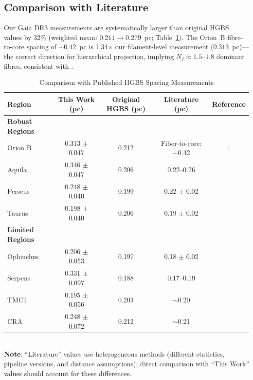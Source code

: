 \documentclass[twoside,twocolumn]{mnras}
\begin{document}
\subsection{Comparison with Literature}

Our Gaia DR3 measurements are systematically larger than original HGBS values by 32\%
(weighted mean: $0.211 \to 0.279$~pc; Table~\ref{tab:literature}). The Orion~B
fibre-to-core spacing of ${\sim}0.42$~pc \citep{Yang2024} is 1.34$\times$ our
filament-level measurement ($0.313$~pc)---the correct direction for hierarchical
projection, implying $N_f \approx 1.5$--$1.8$ dominant fibres, consistent with
\citet{Hacar2018}. 

\begin{table}
\caption{Comparison with Published HGBS Spacing Measurements}
\label{tab:literature}
\begin{tabular}{lcccc}
\toprule
Region & This Work (pc) & Original HGBS (pc) & Literature (pc) & Reference \\
\midrule
\textbf{Robust Regions} &  &  &  &  \\
Orion B & 0.313 $\pm$ 0.047 & 0.212 & Fiber-to-core: $\sim$0.42 & \citet{Konyves2020}; \citet{Yang2024} \\
Aquila  & 0.346 $\pm$ 0.047 & 0.206 & 0.22--0.26 & \citet{Konyves2015} \\
Perseus & 0.248 $\pm$ 0.040 & 0.199 & 0.22 $\pm$ 0.02 & \citet{Andre2016} \\
Taurus  & 0.198 $\pm$ 0.040 & 0.206 & 0.19 $\pm$ 0.02 & \citet{Hacar2013} \\
\midrule
\textbf{Limited Regions} &  &  &  &  \\
Ophiuchus & 0.206 $\pm$ 0.053 & 0.197 & 0.18 $\pm$ 0.02 & \citet{Konyves2020} \\
Serpens  & 0.331 $\pm$ 0.097 & 0.188 & 0.17--0.19 & \citet{Konyves2020} \\
TMC1     & 0.195 $\pm$ 0.056 & 0.203 & $\sim$0.20 & \citet{Hacar2013} \\
CRA      & 0.248 $\pm$ 0.072 & 0.212 & $\sim$0.21 & \citet{Konyves2020} \\
\bottomrule
\end{tabular}
\\ \footnotesize \textbf{Note}: ``Literature'' values use heterogeneous methods (different statistics, pipeline versions, and distance assumptions); direct comparison with ``This Work'' values should account for these differences.
\end{table}
\end{document}
